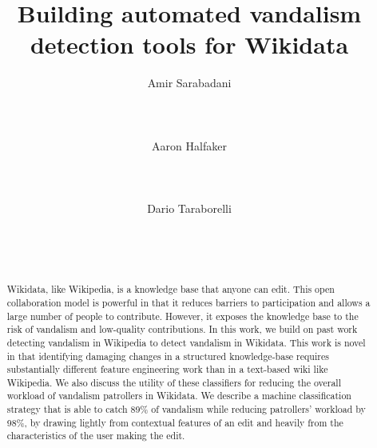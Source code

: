 \documentclass{sig-alternate-2013}
\begin{document}
\title{Building automated vandalism detection tools for Wikidata}

\author{
\alignauthor Amir Sarabadani\\
\\
\\
\\
\alignauthor Aaron Halfaker\\
\\
\\
\\
\alignauthor Dario Taraborelli\\
\\
\\
\\
}

\maketitle
\begin{abstract}
Wikidata, like Wikipedia, is a knowledge base that anyone can edit.  This open collaboration model is powerful in that it reduces barriers to participation and allows a large number of people to contribute. However, it exposes the knowledge base to the risk of vandalism and low-quality contributions.  In this work, we build on past work detecting vandalism in Wikipedia to detect vandalism in Wikidata.  This work is novel in that identifying damaging changes in a structured knowledge-base requires substantially different feature engineering work than in a text-based wiki like Wikipedia.  We also discuss the utility of these classifiers for reducing the overall workload of vandalism patrollers in Wikidata.  We describe a machine classification strategy that is able to catch 89\% of vandalism while reducing patrollers' workload by 98\%, by drawing lightly from contextual features of an edit and heavily from the characteristics of the user making the edit.
\end{abstract}

\end{document}

